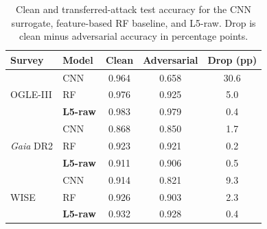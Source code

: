 \begin{table}[t]
\centering
\caption{Clean and transferred-attack test accuracy for the CNN surrogate, feature-based RF baseline, and L5-raw. Drop is clean minus adversarial accuracy in percentage points.}
\label{tab:main_multisurvey}
\begin{tabular}{llccc}
\toprule
Survey & Model & Clean & Adversarial & Drop (pp)\\
\midrule
\multirow{3}{*}{OGLE-III} & CNN & 0.964 & 0.658 & 30.6\\
 & RF & 0.976 & 0.925 & 5.0\\
 & \textbf{L5-raw} & 0.983 & 0.979 & 0.4\\
\midrule
\multirow{3}{*}{\textit{Gaia} DR2} & CNN & 0.868 & 0.850 & 1.7\\
 & RF & 0.923 & 0.921 & 0.2\\
 & \textbf{L5-raw} & 0.911 & 0.906 & 0.5\\
\midrule
\multirow{3}{*}{WISE} & CNN & 0.914 & 0.821 & 9.3\\
 & RF & 0.926 & 0.903 & 2.3\\
 & \textbf{L5-raw} & 0.932 & 0.928 & 0.4\\
\bottomrule
\end{tabular}
\end{table}
